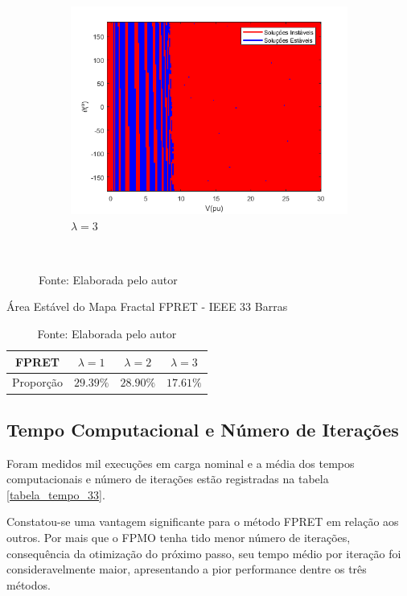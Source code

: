 \begin{figure}[H]
\begin{subfigure}[b]{0.45\textwidth}
        \centering
        \includegraphics[width=\textwidth]{textuais/capitulo4/figuras/33_FP_RET_3lambda.png}
        \caption{$\lambda=3$}
    \end{subfigure}
        \\
   \caption*{Fonte: Elaborada pelo autor}
   \label{fig:FPRET-33}
\end{figure}

\begin{table}[H]
    \centering
    \caption{Área Estável do Mapa Fractal FPRET - IEEE 33 Barras}
    \begin{tabular}{c c c c}
        \toprule
        FPRET & $\lambda = 1$ & $\lambda = 2$ & $\lambda = 3$ \\
        \midrule
        Proporção & $29.39\%$ & $28.90\%$ & $17.61\%$ \\
        \bottomrule
    \end{tabular}
    \caption*{Fonte: Elaborada pelo autor}
    \label{tabela_fractal_FPRET_33}
\end{table}

\subsection{Tempo Computacional e Número de Iterações}

Foram medidos mil execuções em carga nominal e a média dos tempos computacionais e número de iterações estão registradas na tabela \ref{tabela_tempo_33}.

Constatou-se uma vantagem significante para o método \acs{FPRET} em relação aos outros. Por mais que o \acs{FPMO} tenha tido menor número de iterações, consequência da otimização do próximo passo, seu tempo médio por iteração foi consideravelmente maior, apresentando a pior performance dentre os três métodos.

